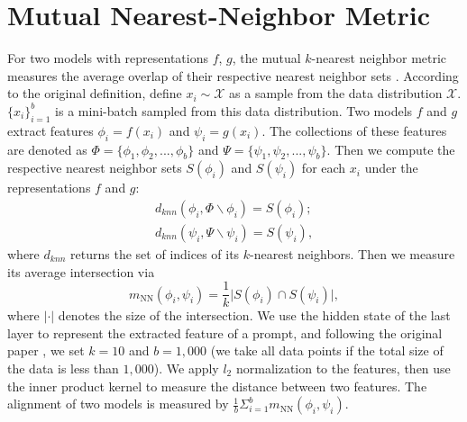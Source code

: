 \section{Mutual Nearest-Neighbor Metric}
\label{cha:metric}
For two models with representations $f$, $g$, the mutual $k$-nearest neighbor metric measures the average overlap of their respective nearest neighbor sets \citep{huh2024platonic}. According to the original definition, define $x_i \sim \mathcal{X}$ as a sample from the data distribution $\mathcal{X}$. $\{x_i\}_{i=1}^b$ is a mini-batch sampled from this data distribution. Two models $f$ and $g$ extract features $\phi_i = f(x_i)$ and $\psi_i = g(x_i)$. The collections of these features are denoted as $\Phi = \{\phi_1, \phi_2,...,\phi_b\}$ and $\Psi = \{\psi_1,\psi_2,...,\psi_b\}$. Then we compute the respective nearest neighbor sets $S(\phi_i)$ and $S(\psi_i)$ for each $x_i$ under the representations $f$ and $g$:
\begin{align}
    d_{knn}(\phi_i, \Phi \backslash \phi_i) = S(\phi_i); \\
    d_{knn}(\psi_i, \Psi \backslash \psi_i) = S(\psi_i),
\end{align}
where $d_{knn}$ returns the set of indices of its $k$-nearest neighbors. Then we measure its average intersection via 
\begin{equation}
    m_{\text{NN}}(\phi_i, \psi_i) = \frac{1}{k} \lvert S(\phi_i) \cap S(\psi_i) \rvert,
\end{equation}
where $\lvert \cdot \rvert$ denotes the size of the intersection. We use the hidden state of the last layer to represent the extracted feature of a prompt, and following the original paper \citep{huh2024platonic}, we set $k=10$ and $b=1,000$ (we take all data points if the total size of the data is less than $1,000$). We apply $l_2$ normalization to the features, then use the inner product kernel to measure the distance between two features. The alignment of two models is measured by $\frac{1}{b} \Sigma_{i=1}^b m_{\text{NN}}(\phi_i, \psi_i)$.
